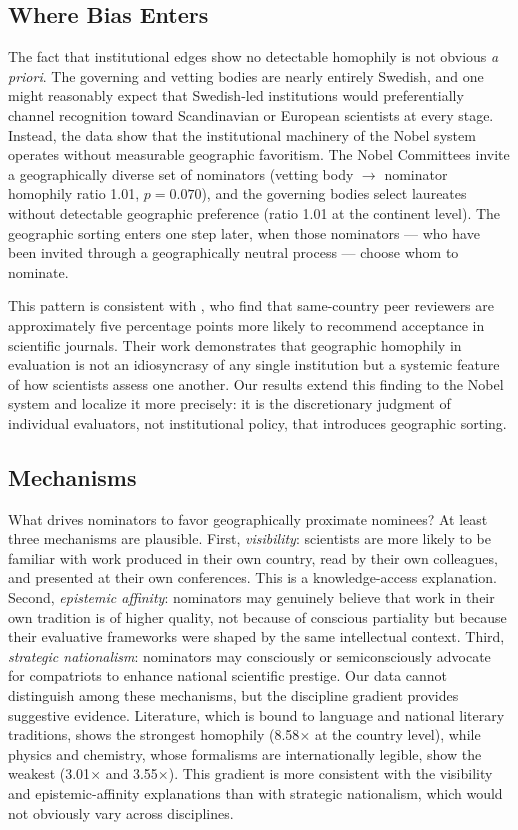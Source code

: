 \documentclass[11pt]{article}
\begin{document}
\subsection{Where Bias Enters}

The fact that institutional edges show no detectable homophily is not obvious \textit{a priori}. The governing and vetting bodies are nearly entirely Swedish, and one might reasonably expect that Swedish-led institutions would preferentially channel recognition toward Scandinavian or European scientists at every stage. Instead, the data show that the institutional machinery of the Nobel system operates without measurable geographic favoritism. The Nobel Committees invite a geographically diverse set of nominators (vetting body $\to$ nominator homophily ratio 1.01, $p = 0.070$), and the governing bodies select laureates without detectable geographic preference (ratio 1.01 at the continent level). The geographic sorting enters one step later, when those nominators --- who have been invited through a geographically neutral process --- choose whom to nominate.

This pattern is consistent with \citet{DumTep2025}, who find that same-country peer reviewers are approximately five percentage points more likely to recommend acceptance in scientific journals. Their work demonstrates that geographic homophily in evaluation is not an idiosyncrasy of any single institution but a systemic feature of how scientists assess one another. Our results extend this finding to the Nobel system and localize it more precisely: it is the discretionary judgment of individual evaluators, not institutional policy, that introduces geographic sorting.

\subsection{Mechanisms}

What drives nominators to favor geographically proximate nominees? At least three mechanisms are plausible. First, \emph{visibility}: scientists are more likely to be familiar with work produced in their own country, read by their own colleagues, and presented at their own conferences. This is a knowledge-access explanation. Second, \emph{epistemic affinity}: nominators may genuinely believe that work in their own tradition is of higher quality, not because of conscious partiality but because their evaluative frameworks were shaped by the same intellectual context. Third, \emph{strategic nationalism}: nominators may consciously or semiconsciously advocate for compatriots to enhance national scientific prestige. Our data cannot distinguish among these mechanisms, but the discipline gradient provides suggestive evidence. Literature, which is bound to language and national literary traditions, shows the strongest homophily (8.58$\times$ at the country level), while physics and chemistry, whose formalisms are internationally legible, show the weakest (3.01$\times$ and 3.55$\times$). This gradient is more consistent with the visibility and epistemic-affinity explanations than with strategic nationalism, which would not obviously vary across disciplines.
\end{document}

